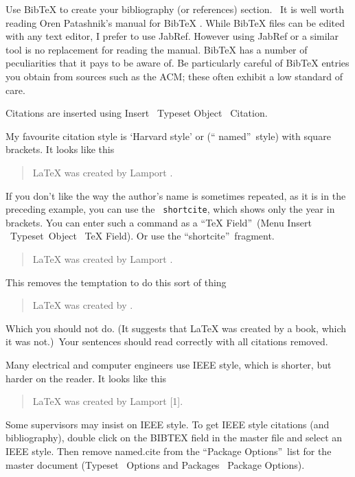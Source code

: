 Use BibTeX to create your bibliography (or references) section. \ It is well
worth reading Oren Patashnik's manual for BibTeX \cite{Patashnik-1988}.
While BibTeX files can be edited with any text editor, I prefer to use
JabRef. However using JabRef or a similar tool is no replacement for reading
the manual. BibTeX has a number of peculiarities that it pays to be aware
of. Be particularly careful of BibTeX entries you obtain from sources such
as the ACM; these often exhibit a low standard of care.

Citations are inserted using Insert \TEXTsymbol{>}\TEXTsymbol{>}\ Typeset
Object \TEXTsymbol{>}\TEXTsymbol{>}\ Citation.

My favourite citation style is `Harvard style' or (\textquotedblleft
named\textquotedblright\ style) with square brackets. It looks like this

\begin{quotation}
LaTeX was created by Lamport \cite{Lamport-1994}.
\end{quotation}

If you don't like the way the author's name is sometimes repeated, as it is
in the preceding example, you can use the \texttt{\TEXTsymbol{\backslash}%
shortcite}, which shows only the year in brackets. You can enter such a
command as a \textquotedblleft TeX Field\textquotedblright\ (Menu Insert 
\TEXTsymbol{>}\TEXTsymbol{>}\ Typeset\ Object \TEXTsymbol{>}\TEXTsymbol{>}\
TeX Field). Or use the \textquotedblleft shortcite\textquotedblright\
fragment.

\begin{quotation}
LaTeX was created by Lamport 
\shortcite{Lamport-1994}%
.
\end{quotation}

\noindent This removes the temptation to do this sort of thing

\begin{quotation}
LaTeX was created by \cite{Lamport-1994}.
\end{quotation}

\noindent Which you should not do. (It suggests that LaTeX was created by a
book, which it was not.)\ Your sentences should read correctly with all
citations removed.

Many electrical and computer engineers use IEEE style, which is shorter, but
harder on the reader. It looks like this

\begin{quotation}
LaTeX was created by Lamport [1].
\end{quotation}

\noindent Some supervisors may insist on IEEE style. To get IEEE style
citations (and bibliography), double click on the BIBTEX field in the master
file and select an IEEE style. Then remove named.cite from the
\textquotedblleft Package Options\textquotedblright\ list for the master
document (Typeset \TEXTsymbol{>}\TEXTsymbol{>}\ Options and Packages 
\TEXTsymbol{>}\TEXTsymbol{>}\ Package Options).
